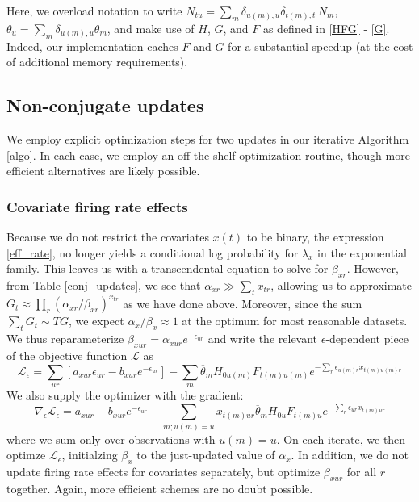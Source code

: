 \documentclass{article} %
\begin{document}
Here, we overload notation to write $N_{tu} = \sum_m \delta_{u(m), u} \delta_{t(m), t}\, N_m$, $\overline{\theta}_u = \sum_m \delta_{u(m), u}\overline{\theta}_m$, and make use of $H$, $G$, and $F$ as defined in \ref{HFG} - \ref{G}. Indeed, our implementation caches $F$ and $G$ for a substantial speedup (at the cost of additional memory requirements).

\subsection{Non-conjugate updates}
\label{non-conj}
We employ explicit optimization steps for two updates in our iterative Algorithm \ref{algo}. In each case, we employ an off-the-shelf optimization routine, though more efficient alternatives are likely possible.

\subsubsection{Covariate firing rate effects}
\label{beta_x}
Because we do not restrict the covariates $x(t)$ to be binary, the expression \ref{eff_rate}, no longer yields a conditional log probability for $\lambda_x$ in the exponential family. This leaves us with a transcendental equation to solve for $\beta_{xr}$. However, from Table \ref{conj_updates}, we see that $\alpha_{xr} \gg \sum_t x_{tr}$, allowing us to approximate $G_t \approx \prod_r (\alpha_{xr}/\beta_{xr})^{x_{tr}}$ as we have done above. Moreover, since the sum $\sum_t G_t \sim T\overline{G}$, we expect $\alpha_x / \beta_x \approx 1$ at the optimum for most reasonable datasets. We thus reparameterize $\beta_{xur} = \alpha_{xur}e^{-\epsilon_{ur}}$ and write the relevant $\epsilon$-dependent piece of the objective function $\mathcal{L}$ as
\begin{equation}
    \mathcal{L}_\epsilon = \sum_{ur} \left[a_{xur}\epsilon_{ur} - b_{xur}e^{-\epsilon_{ur}} \right] - \sum_m \overline{\theta}_m H_{0u(m)} F_{t(m)u(m)}
    e^{-\sum_r \epsilon_{u(m)r} x_{t(m)u(m)r}}
\end{equation}
We also supply the optimizer with the gradient:
\begin{equation}
    \nabla_\epsilon \mathcal{L}_\epsilon = a_{xur} - b_{xur}e^{-\epsilon_{ur}}  - \sum_{m; u(m) = u} x_{t(m)ur} \overline{\theta}_m H_{0u} F_{t(m)u}
    e^{-\sum_r \epsilon_{ur} x_{t(m)ur}}
\end{equation}
where we sum only over observations with $u(m) = u$. On each iterate, we then optimze $\mathcal{L}_\epsilon$, initialzing $\beta_x$ to the just-updated value of $\alpha_x$. In addition, we do not update firing rate effects for covariates separately, but optimize $\beta_{xur}$ for all $r$ together. Again, more efficient schemes are no doubt possible.
\end{document}
